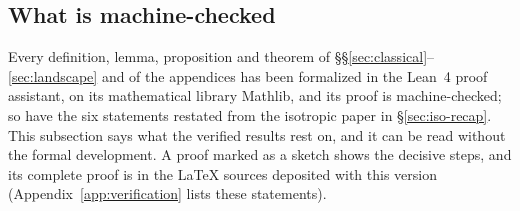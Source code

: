 \subsection{What is machine-checked}\label{sec:trust-base}
Every definition, lemma, proposition and theorem of \S\S\ref{sec:classical}--\ref{sec:landscape}
and of the appendices has been formalized in the Lean~4 proof assistant, on its mathematical library
Mathlib, and its proof is machine-checked; so have the six statements restated from the isotropic
paper in \S\ref{sec:iso-recap}. This subsection says what the verified results rest on, and it can be
read without the formal development. A proof marked as a sketch shows the decisive steps, and its
complete proof is in the LaTeX sources deposited with this version (Appendix~\ref{app:verification}
lists these statements).

